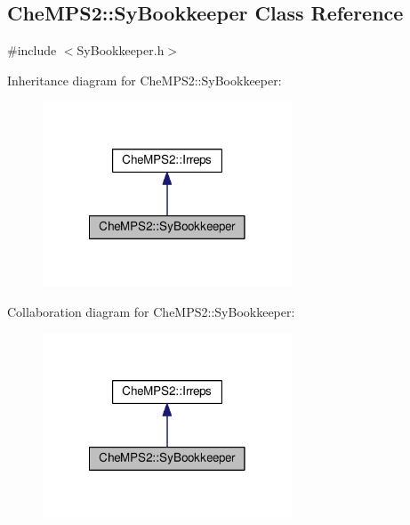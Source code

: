\hypertarget{classCheMPS2_1_1SyBookkeeper}{\subsection{Che\-M\-P\-S2\-:\-:Sy\-Bookkeeper Class Reference}
\label{classCheMPS2_1_1SyBookkeeper}
}


{\ttfamily \#include $<$Sy\-Bookkeeper.\-h$>$}



Inheritance diagram for Che\-M\-P\-S2\-:\-:Sy\-Bookkeeper\-:\nopagebreak
\begin{figure}[H]
\begin{center}
\leavevmode
\includegraphics[width=210pt]{classCheMPS2_1_1SyBookkeeper__inherit__graph}
\end{center}
\end{figure}


Collaboration diagram for Che\-M\-P\-S2\-:\-:Sy\-Bookkeeper\-:\nopagebreak
\begin{figure}[H]
\begin{center}
\leavevmode
\includegraphics[width=210pt]{classCheMPS2_1_1SyBookkeeper__coll__graph}
\end{center}
\end{figure}

